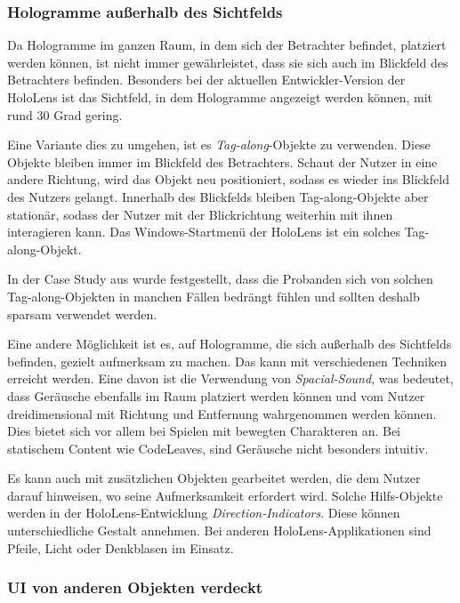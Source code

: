 \subsubsection*{Hologramme außerhalb des Sichtfelds}

Da Hologramme im ganzen Raum, in dem sich der Betrachter befindet, platziert werden können, ist nicht immer gewährleistet, dass sie sich auch im Blickfeld des Betrachters befinden. Besonders bei der aktuellen Entwickler-Version der HoloLens ist das Sichtfeld, in dem Hologramme angezeigt werden können, mit rund 30 Grad \cite{czerulla2017microsoft} gering.

Eine Variante dies zu umgehen, ist es \textit{Tag-along}-Objekte zu verwenden. Diese Objekte bleiben immer im Blickfeld des Betrachters. Schaut der Nutzer in eine andere Richtung, wird das Objekt neu positioniert, sodass es wieder ins Blickfeld des Nutzers gelangt. Innerhalb des Blickfelds bleiben Tag-along-Objekte aber stationär, sodass der Nutzer mit der Blickrichtung weiterhin mit ihnen interagieren kann. Das Windows-Startmenü der HoloLens ist ein solches Tag-along-Objekt.

In der Case Study aus \cite{windows2017casestudy3} wurde festgestellt, dass die Probanden sich von solchen Tag-along-Objekten in manchen Fällen bedrängt fühlen und sollten deshalb sparsam verwendet werden.

Eine andere Möglichkeit ist es, auf Hologramme, die sich außerhalb des Sichtfelds befinden, gezielt aufmerksam zu machen. Das kann mit verschiedenen Techniken erreicht werden. Eine davon ist die Verwendung von \textit{Spacial-Sound}, was bedeutet, dass Geräusche ebenfalls im Raum platziert werden können und vom Nutzer dreidimensional mit Richtung und Entfernung wahrgenommen werden können. Dies bietet sich vor allem bei Spielen mit bewegten Charakteren an. Bei statischem Content wie CodeLeaves, sind Geräusche nicht besonders intuitiv.

Es kann auch mit zusätzlichen Objekten gearbeitet werden, die dem Nutzer darauf hinweisen, wo seine Aufmerksamkeit erfordert wird. Solche Hilfs-Objekte werden in der HoloLens-Entwicklung \textit{Direction-Indicators}. Diese können unterschiedliche Gestalt annehmen. Bei anderen HoloLens-Applikationen sind Pfeile, Licht oder Denkblasen im Einsatz.

\subsubsection*{UI von anderen Objekten verdeckt}

